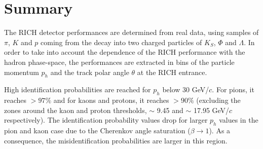 
\section{Summary}

The RICH detector performances are determined from real data, using samples of $\pi$, $K$ and $p$ coming from the decay into two charged particles of $K_S$, $\Phi$ and $\Lambda$. In order to take into account the dependence of the RICH performance with the hadron phase-space, the performances are extracted in bins of the particle momentum $p_h$ and the track polar angle $\theta$ at the RICH entrance.

High identification probabilities are reached for $p_h$ below 30 GeV/$c$. For pions, it reaches $> 97\%$ and for kaons and protons, it reaches $> 90\%$ (excluding the zones around the kaon and proton thresholds, $\sim$ 9.45 and $\sim$ 17.95 GeV/$c$ respectively). The identification probability values drop for larger $p_h$ values in the pion and kaon case due to the Cherenkov angle saturation ($\beta \rightarrow 1$). As a consequence, the misidentification probabilities are larger in this region.

